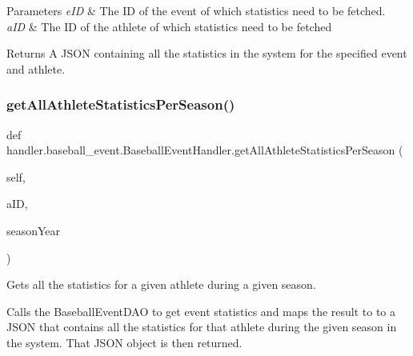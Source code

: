 \begin{DoxyParams}{Parameters}
{\em e\+ID} & The ID of the event of which statistics need to be fetched. \\
\hline
{\em a\+ID} & The ID of the athlete of which statistics need to be fetched\\
\hline
\end{DoxyParams}
\begin{DoxyReturn}{Returns}
A J\+S\+ON containing all the statistics in the system for the specified event and athlete. 
\end{DoxyReturn}
\mbox{\label{classhandler_1_1baseball__event_1_1_baseball_event_handler_a501eccbe7b2294ac4213a8fd53b55216}} 
\subsubsection{\texorpdfstring{get\+All\+Athlete\+Statistics\+Per\+Season()}{getAllAthleteStatisticsPerSeason()}}
{\footnotesize\ttfamily def handler.\+baseball\+\_\+event.\+Baseball\+Event\+Handler.\+get\+All\+Athlete\+Statistics\+Per\+Season (\begin{DoxyParamCaption}\item[{}]{self,  }\item[{}]{a\+ID,  }\item[{}]{season\+Year }\end{DoxyParamCaption})}



Gets all the statistics for a given athlete during a given season. 

Calls the Baseball\+Event\+D\+AO to get event statistics and maps the result to to a J\+S\+ON that contains all the statistics for that athlete during the given season in the system. That J\+S\+ON object is then returned.


